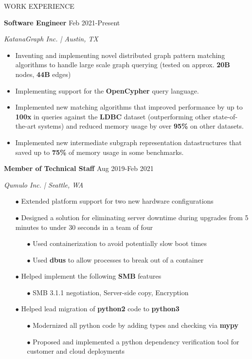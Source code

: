 \documentclass[paper=a4,fontsize=11pt]{scrartcl} %
\newcommand{\sepspace}{\vspace*{1em}}		%
\newcommand{\NewPart}[1]{ \noindent \large \usefont{OT1}{phv}{b}{n}\uppercase{#1} \normalfont \normalsize}
\newcommand{\EducationEntry}[4]{
		\noindent \textbf{#1}     %
			\hfill#2 \par  %
		\noindent \textit{#3} \par        %
		\noindent\hangafter=0 \small #4 %
		\normalsize \par}
\begin{document}
\begin{minipage}[t]{0.7\textwidth}
\sepspace

\NewPart{Work experience}{}

\EducationEntry{Software Engineer}{Feb 2021-Present}{KatanaGraph Inc. | Austin, TX}{
\begin{itemize}
  \item Inventing and implementing novel distributed graph pattern matching algorithms to handle large scale graph querying (tested on approx. \textbf{20B} nodes, \textbf{44B} edges)
  \item Implementing support for the \textbf{OpenCypher} query language.
  \item Implemented new matching algorithms that improved performance by up to \textbf{100x} in queries against the \textbf{LDBC} dataset (outperforming other state-of-the-art systems) and reduced memory usage by over \textbf{95\%} on other datasets.
  \item Implemented new intermediate subgraph representation datastructures that saved up to \textbf{75\%} of memory usage in some benchmarks.
\end{itemize}
}

\EducationEntry{Member of Technical Staff}{Aug 2019-Feb 2021}{Qumulo Inc. | Seattle, WA}{
\begin{itemize}
  \item[$\bullet$] Extended platform support for two new hardware configurations
  \item[$\bullet$] Designed a solution for eliminating server downtime during upgrades from 5 minutes to under 30 seconds in a team of four
    \begin{itemize}
        \item[$\bullet$] Used containerization to avoid potentially slow boot times
        \item[$\bullet$] Used \textbf{dbus} to allow processes to break out of a container
    \end{itemize}
  \item[$\bullet$] Helped implement the following \textbf{SMB} features
    \begin{itemize}
      \item[$\bullet$] SMB 3.1.1 negotiation, Server-side copy, Encryption
    \end{itemize}
  \item[$\bullet$] Helped lead migration of \textbf{python2} code to \textbf{python3}
    \begin{itemize}
      \item[$\bullet$] Modernized all python code by adding types and checking via \textbf{mypy}
      \item[$\bullet$] Proposed and implemented a python dependency verification tool for customer and cloud deployments
    \end{itemize}
\end{itemize}
}


\end{minipage}
\end{document}
